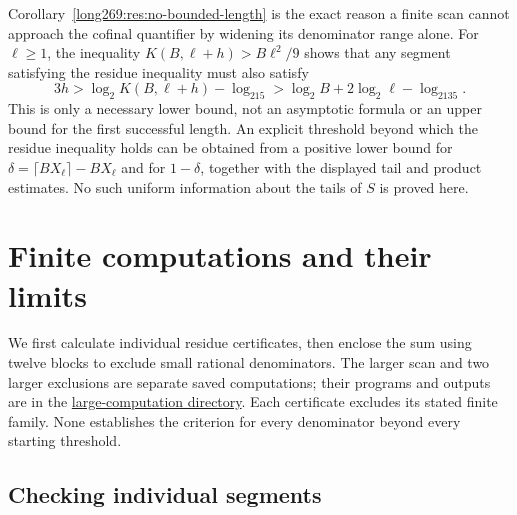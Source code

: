 \noindent Corollary~\ref{long269:res:no-bounded-length} is the exact reason a finite
scan cannot approach the cofinal quantifier by widening its denominator range
alone.  For $\ell\ge1$, the inequality
$K(B,\ell+h)>B\ell^2/9$ shows that any segment satisfying the residue inequality must also satisfy
\[
 3h>\log_2K(B,\ell+h)-\log_215
    >\log_2B+2\log_2\ell-\log_2135.
\]
This is only a necessary lower bound, not an asymptotic formula or an
upper bound for the first successful length.
An explicit threshold beyond which the residue inequality holds can be obtained from a positive
lower bound for $\delta=\lceil BX_\ell\rceil-BX_\ell$ and for $1-\delta$,
together with the displayed tail and product estimates.  No such uniform information about the tails of $S$ is proved here.

\section{Finite computations and their limits}\label{long269:sec:evidence}

We first calculate individual residue certificates, then enclose the
sum using twelve blocks to exclude small rational denominators. The
larger scan and two larger exclusions are separate saved computations;
their programs and outputs are in the
\href{https://github.com/wcook04/plectis-erdos/tree/f757115e03bebe5c04431a147da559015c680a37/research/experiments/erdos269/large-computations}{large-computation directory}.
Each certificate excludes its stated finite family. None establishes
the criterion for every denominator beyond every starting threshold.

\subsection{Checking individual segments}

